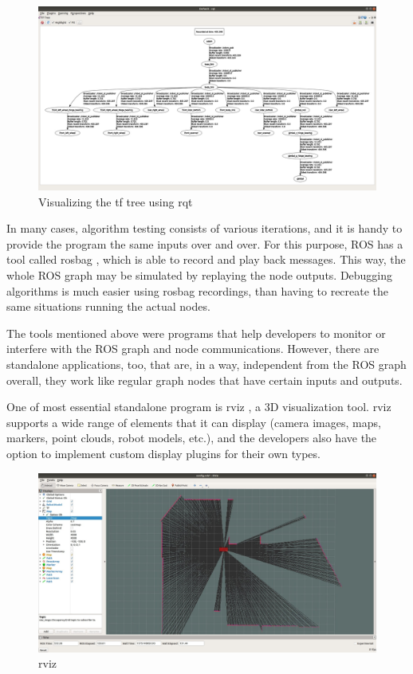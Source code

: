 \begin{figure}[!ht]
	\centering
	\includegraphics[width=\textwidth]{figures/raw/jpeg/rqt.jpg}
	\caption{Visualizing the tf tree using rqt}
	\label{rqt_graph}
\end{figure}

In many cases, algorithm testing consists of various iterations, and it is handy to provide the program the same inputs over and over. For this purpose, ROS has a tool called rosbag \cite{ros_rosbag}, which is able to record and play back messages. This way, the whole ROS graph may be simulated by replaying the node outputs. Debugging algorithms is much easier using rosbag recordings, than having to recreate the same situations running the actual nodes.

The tools mentioned above were programs that help developers to monitor or interfere with the ROS graph and node communications. However, there are standalone applications, too, that are, in a way, independent from the ROS graph overall, they work like regular graph nodes that have certain inputs and outputs.

One of most essential standalone program is rviz \cite{ros_rviz}, a 3D visualization tool. rviz supports a wide range of elements that it can display (camera images, maps, markers, point clouds, robot models, etc.), and the developers also have the option to implement custom display plugins for their own types.

\begin{figure}[!ht]
	\centering
	\includegraphics[width=\textwidth]{figures/raw/jpeg/rviz.jpg}
	\caption{rviz}
	\label{rviz}
\end{figure}

